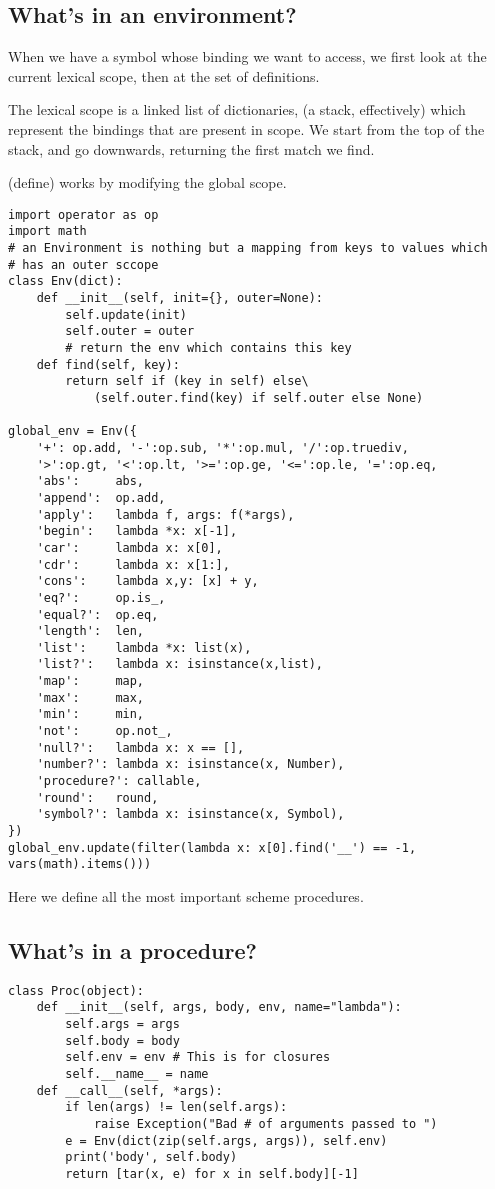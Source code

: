\documentclass[11pt]{article}
\begin{document}
\subsection{What's in an environment?}
\label{sec:org4de6658}
When we have a symbol whose binding we want to access, we first look
at the current lexical scope, then at the set of definitions.

The lexical scope is a linked list of dictionaries, (a stack,
effectively) which represent the bindings that are present in
scope. We start from the top of the stack, and go downwards,
returning the first match we find. 

(define) works by modifying the global scope.

\begin{verbatim}
import operator as op
import math
# an Environment is nothing but a mapping from keys to values which
# has an outer sccope
class Env(dict):
    def __init__(self, init={}, outer=None):
        self.update(init)
        self.outer = outer
        # return the env which contains this key
    def find(self, key):
        return self if (key in self) else\
            (self.outer.find(key) if self.outer else None)

global_env = Env({
    '+': op.add, '-':op.sub, '*':op.mul, '/':op.truediv,
    '>':op.gt, '<':op.lt, '>=':op.ge, '<=':op.le, '=':op.eq,
    'abs':     abs,
    'append':  op.add,
    'apply':   lambda f, args: f(*args),
    'begin':   lambda *x: x[-1],
    'car':     lambda x: x[0],
    'cdr':     lambda x: x[1:],
    'cons':    lambda x,y: [x] + y,
    'eq?':     op.is_,
    'equal?':  op.eq,
    'length':  len,
    'list':    lambda *x: list(x),
    'list?':   lambda x: isinstance(x,list),
    'map':     map,
    'max':     max,
    'min':     min,
    'not':     op.not_,
    'null?':   lambda x: x == [],
    'number?': lambda x: isinstance(x, Number),
    'procedure?': callable,
    'round':   round,
    'symbol?': lambda x: isinstance(x, Symbol),
})
global_env.update(filter(lambda x: x[0].find('__') == -1, vars(math).items()))
\end{verbatim}

Here we define all the most important scheme procedures.

\subsection{What's in a procedure?}
\label{sec:org216c97b}
\begin{verbatim}
class Proc(object):
    def __init__(self, args, body, env, name="lambda"):
        self.args = args
        self.body = body
        self.env = env # This is for closures
        self.__name__ = name
    def __call__(self, *args):
        if len(args) != len(self.args):
            raise Exception("Bad # of arguments passed to ")
        e = Env(dict(zip(self.args, args)), self.env)
        print('body', self.body)
        return [tar(x, e) for x in self.body][-1]
\end{verbatim}
\end{document}
